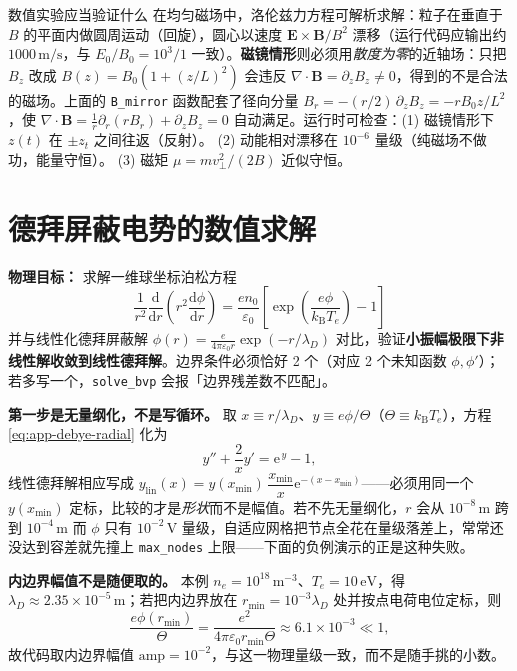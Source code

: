 \documentclass[12pt,a4paper,openany,oneside]{book}
\newcommand{\diff}{\mathrm{d}}
\newcommand{\ee}{\mathrm{e}}
\newcommand{\eps}{\varepsilon}
\newcommand{\vect}[1]{\bm{#1}}
\newcommand{\divg}{\nabla\cdot}
\begin{document}
\begin{insight}{数值实验应当验证什么}{}
在均匀磁场中，洛伦兹力方程可解析求解：粒子在垂直于 $B$ 的平面内做圆周运动（回旋），圆心以速度 $\vect{E}\times\vect{B}/B^2$ 漂移（运行代码应输出约 $1000\,\mathrm{m/s}$，与 $E_0/B_0=10^3/1$ 一致）。\textbf{磁镜情形}则必须用\emph{散度为零}的近轴场：只把 $B_z$ 改成 $B(z)=B_0(1+(z/L)^2)$ 会违反 $\divg\vect{B}=\partial_zB_z\ne0$，得到的不是合法的磁场。上面的 \texttt{B\_mirror} 函数配套了径向分量 $B_r = -(r/2)\,\partial_zB_z = -rB_0z/L^2$，使 $\divg\vect{B}=\frac1r\partial_r(rB_r)+\partial_zB_z=0$ 自动满足。运行时可检查：(1) 磁镜情形下 $z(t)$ 在 $\pm z_t$ 之间往返（反射）。
(2) 动能相对漂移在 $10^{-6}$ 量级（纯磁场不做功，能量守恒）。
(3) 磁矩 $\mu=mv_\perp^2/(2B)$ 近似守恒。
\end{insight}


\section{德拜屏蔽电势的数值求解}

\textbf{物理目标：} 求解一维球坐标泊松方程
\begin{equation}
\frac{1}{r^2}\frac{\diff}{\diff r}\left(r^2\frac{\diff\phi}{\diff r}\right) = \frac{e n_0}{\eps_0}\left[\exp\!\left(\frac{e\phi}{k_\mathrm{B}T_e}\right)-1\right]
\label{eq:app-debye-radial}
\end{equation}
并与线性化德拜屏蔽解 $\phi(r)=\frac{e}{4\pi\eps_0 r}\exp(-r/\lambda_D)$ 对比，验证\textbf{小振幅极限下非线性解收敛到线性德拜解}。边界条件必须恰好 2 个（对应 2 个未知函数 $\phi,\phi'$）；若多写一个，\texttt{solve\_bvp} 会报「边界残差数不匹配」。

\textbf{第一步是无量纲化，不是写循环。} 取 $x\equiv r/\lambda_D$、$y\equiv e\phi/\Theta$（$\Theta\equiv k_\mathrm{B}T_e$），方程 \eqref{eq:app-debye-radial} 化为
\begin{equation}
y''+\frac{2}{x}y' = \ee^{\,y}-1 ,
\label{eq:app-debye-dimensionless}
\end{equation}
线性德拜解相应写成 $y_{\text{lin}}(x)=y(x_{\min})\,\dfrac{x_{\min}}{x}\ee^{-(x-x_{\min})}$——必须用同一个 $y(x_{\min})$ 定标，比较的才是\emph{形状}而不是幅值。若不先无量纲化，$r$ 会从 $10^{-8}\,\mathrm{m}$ 跨到 $10^{-4}\,\mathrm{m}$ 而 $\phi$ 只有 $10^{-2}\,\mathrm{V}$ 量级，自适应网格把节点全花在量级落差上，常常还没达到容差就先撞上 \texttt{max\_nodes} 上限——下面的负例演示的正是这种失败。

\textbf{内边界幅值不是随便取的。} 本例 $n_e=10^{18}\,\mathrm{m^{-3}}$、$T_e=10\,\mathrm{eV}$，得 $\lambda_D\approx2.35\times10^{-5}\,\mathrm{m}$；若把内边界放在 $r_{\min}=10^{-3}\lambda_D$ 处并按点电荷电位定标，则
\begin{equation}
\frac{e\phi(r_{\min})}{\Theta}=\frac{e^2}{4\pi\eps_0 r_{\min}\Theta}\approx6.1\times10^{-3}\ll1 ,
\end{equation}
故代码取内边界幅值 $\mathrm{amp}=10^{-2}$，与这一物理量级一致，而不是随手挑的小数。
\end{document}
